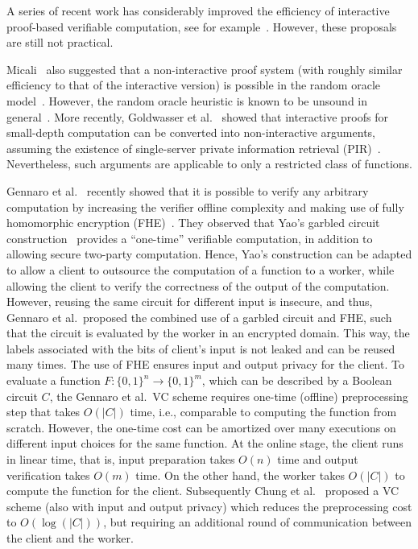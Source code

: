 A series of recent work has considerably improved the efficiency of interactive proof-based verifiable computation, see for example~\cite{CMT12,SMB+12,SVP+12,TRM+12,VSB+13}.
However, these proposals are still not practical.

Micali~\cite{Mic94} also suggested that a non-interactive proof system (with roughly similar efficiency to that of the interactive version) is possible in the random oracle model~\cite{BR93}.
However, the random oracle heuristic is known to be unsound in general~\cite{CGH04}.
More recently, Goldwasser et al.~\cite{GKR08} showed that interactive proofs for small-depth computation can be converted into non-interactive arguments, assuming the existence of single-server private information retrieval (PIR)~\cite{CKG+98}.
Nevertheless, such arguments are applicable to only a restricted class of functions.

Gennaro et al.~\cite{GGP10} recently showed that it is possible to verify any arbitrary computation by increasing the verifier offline complexity and making use of fully homomorphic encryption (FHE)~\cite{Gen09}.
They observed that Yao's garbled circuit construction~\cite{Yao82} provides a ``one-time'' verifiable computation, in addition to allowing secure two-party computation.
Hence, Yao's construction can be adapted to allow a client to outsource the computation of a function to a worker, while allowing the client to verify the correctness of the output of the computation.
However, reusing the same circuit for different input is insecure, and thus, Gennaro et al.\ proposed the combined use of a garbled circuit and FHE, such that the circuit is evaluated by the worker in an encrypted domain.
This way, the labels associated with the bits of client's input is not leaked and can be reused many times.
The use of FHE ensures input and output privacy for the client.
To evaluate a function $F:\{0,1\}^n \to \{0,1\}^m$, which can be described by a Boolean circuit $C$, the Gennaro et al.\ VC scheme requires one-time (offline)  preprocessing step that takes $O(|C|)$ time, i.e., comparable to computing the function from scratch.
However, the one-time cost can be amortized over many executions on different input choices for the same function.
At the online stage, the client runs in linear time, that is, input preparation takes $O(n)$ time and output verification takes $O(m)$ time.
On the other hand, the worker takes $O(|C|)$ to compute the function for the client.
Subsequently Chung et al.~\cite{CKV10} proposed a VC scheme (also with input and output privacy) which reduces the preprocessing cost to $O(\log(|C|))$, but requiring an additional round of communication between the client and the worker.


